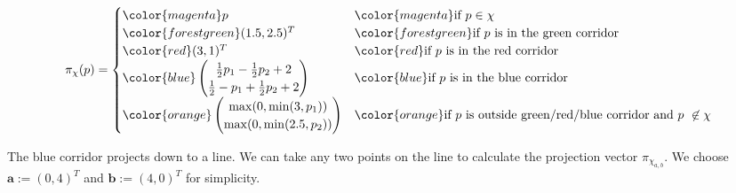 \begin{equation*}
  \pi_\chi(p) = 
  \begin{cases}
    {\color{magenta}p} & {\color{magenta}\text{if } p\in \chi} \\
    {\color{forestgreen}(1.5,2.5)^T} & {\color{forestgreen}\text{if $p$ is in the green corridor}} \\
    {\color{red}(3,1)^T} & {\color{red}\text{if $p$ is in the red corridor}} \\
    {\color{blue}\begin{pmatrix}
      \frac{1}{2} p_1 - \frac{1}{2} p_2 + 2 \\
      \frac{1}{2} - p_1 + \frac{1}{2} p_2 + 2 \\
    \end{pmatrix}} & {\color{blue}\text{if $p$ is in the blue corridor}} \\
    {\color{orange}\begin{pmatrix}
      \mathrm{max}(0, \mathrm{min}(3, p_1)) \\
      \mathrm{max}(0, \mathrm{min}(2.5, p_2))
    \end{pmatrix}} & {\color{orange}\text{if $p$ is outside green/red/blue corridor and } p \not\in \chi}
    \end{cases} 
\end{equation*}
\begin{flushleft}
The blue corridor projects down to a line. We can take any two points on the line to calculate the projection vector $\pi_{\chi_{a,b}}$. We choose $\mathbf{a}:=(0,4)^T$ and $\mathbf{b}:=(4,0)^T$ for simplicity.
\end{flushleft}

